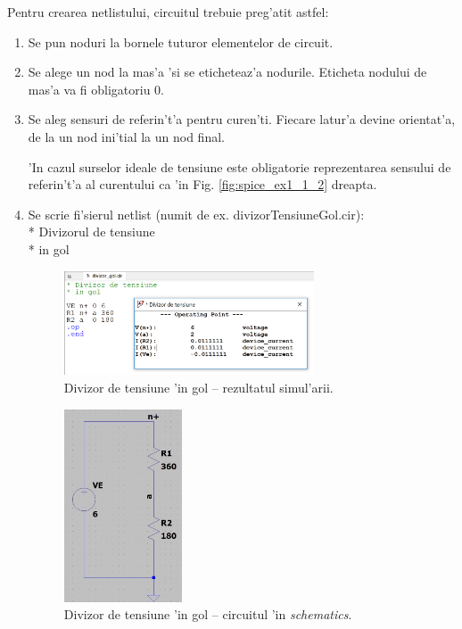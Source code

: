 Pentru crearea netlistului, circuitul trebuie preg'atit astfel:
\begin{enumerate}
\item Se pun noduri la bornele tuturor elementelor de circuit.
\item Se alege un nod la mas'a 'si se eticheteaz'a nodurile. Eticheta nodului de mas'a va fi obligatoriu 0.
\item Se aleg sensuri de referin't'a pentru curen'ti. Fiecare latur'a devine orientat'a, de la un nod ini'tial la un nod final.

\begin{retine}
  \label{retine3_1}
  \index{}
    'In cazul surselor ideale de tensiune este obligatorie reprezentarea sensului de referin't'a al curentului ca 'in Fig. \ref{fig:spice_ex1_1_2} dreapta.
\end{retine}


\item Se scrie fi'sierul netlist (numit de ex. divizorTensiuneGol.cir): \\
\textcolor{OliveGreen}{* Divizorul de tensiune} \\
\textcolor{OliveGreen}{* in gol}

\begin{figure}[!b]
	\centering
		\includegraphics[width=0.7\textwidth]{laborator_01/figuri/spice_divizor_gol_op}
	\caption{Divizor de tensiune 'in gol -- rezultatul simul'arii.}
	\label{fig:spice_ex1_3}
\end{figure}
\begin{figure}[!b]
	\centering
		\includegraphics[width=0.33\textwidth]{laborator_01/figuri/spice_divizor_schematics}
	\caption{Divizor de tensiune 'in gol -- circuitul 'in \textit{schematics}.}
	\label{fig:spice_ex1_4}
\end{figure}


\end{enumerate}
